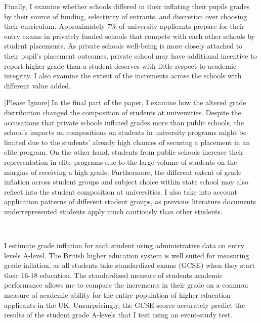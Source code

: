 Finally, I examine whether schools differed in their inflating their pupils grades by their source of funding, selectivity of entrants, and discretion over choosing their curriculum. Approximately 7\% of university applicants prepare for their entry exams in privately funded schools that compete with each other schools by student placements. As private schools well-being is more closely attached to their pupil's placement outcomes, private school may have additional incentive to report higher grade than a student deserves with little respect to academic integrity. I also examine the extent of the increments across the schools with different value added. 

[Please Ignore] In the final part of the paper, I examine how the altered grade distribution changed the composition of students at universities. Despite the accusations that private schools inflated grades more than public schools, the school's impacts on compositions on students in university programs might be limited due to the students' already high chances of securing a placement in an elite program. On the other hand, students from public schools increase their representation in elite programs due to the large volume of students on the margins of receiving a high grade. Furthermore, the different extent of grade inflation across student groups and subject choice within state school may also reflect into the student composition at universities. I also take into account application patterns of different student groups, as previous literature documents underrepresented students apply much cautiously than other students.

\

I estimate grade inflation for each student using administrative data on entry levels A-level. The British higher education system is well suited for measuring grade inflation, as all students take standardized exams (GCSE) when they start their 16-18 education. The standardized measure of students academic performance allows me to compare the increments in their grade on a common measure of academic ability for the entire population of higher education applicants in the UK. Unsurprisingly, the GCSE scores accurately predict the results of the student grade A-levels that I test using an event-study test. 

